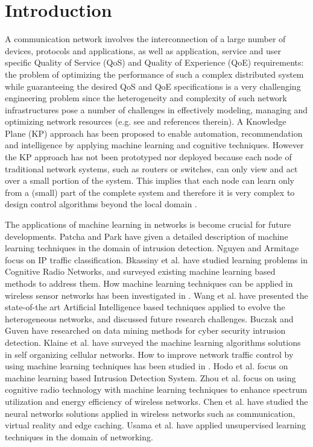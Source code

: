 \chapter*{\centering Introduction}  

A communication network involves the interconnection of a large number of devices, protocols and applications, as well as application, service and user specific Quality of Service (QoS) and Quality of Experience (QoE) requirements: the problem of optimizing the performance of such a complex distributed system while guaranteeing the desired QoS and QoE specifications is a very challenging engineering problem since the heterogeneity and complexity of such network infrastructures pose a number of challenges in effectively modeling, managing and optimizing network resources (e.g. see \cite{Neely2010,Lemeshko2019} and references therein). A Knowledge Plane (KP) approach \cite{Clark2003} has been proposed to enable automation, recommendation and intelligence by applying machine learning and cognitive techniques. However the KP approach has not been prototyped nor deployed because each node of traditional network systems, such as routers or switches, can only view and act over a small portion of the system. This implies that each node can learn only from a (small) part of the complete system and therefore it is very complex to design control algorithms beyond the local domain \cite{Mestres2017}.

The applications of machine learning in networks is become crucial for future developments. Patcha and Park \cite{Patcha2007} have given a detailed description of machine learning techniques in the domain of intrusion detection. Nguyen and Armitage \cite{Nguyen2008} focus on IP traffic classification. Bkassiny et al. \cite{Bkassiny2013} have studied learning problems in Cognitive Radio Networks, and surveyed existing machine learning based methods to address them. How machine learning techniques can be applied in wireless sensor networks has been investigated in \cite{Alsheikh2014}. Wang et al. \cite{Wang2015} have presented the state-of-the art Artificial Intelligence based techniques applied to evolve the heterogeneous networks, and discussed future research challenges. Buczak and Guven \cite{Buczak2016} have researched on data mining methods for cyber security intrusion detection. Klaine et al. \cite{Klaine2017} have surveyed the machine learning algorithms solutions in self organizing cellular networks. How to improve network traffic control by using machine learning techniques has been studied in \cite{Fadlullah2017}. Hodo et al. \cite{Hodo2017} focus on machine learning based Intrusion Detection System. Zhou et al. \cite{Zhou2017} focus on using cognitive radio technology with machine learning techniques to enhance spectrum utilization and energy efficiency of wireless networks. Chen et al. \cite{Chen2017} have studied the neural networks solutions applied in wireless networks such as communication, virtual reality and edge caching. Usama et al. \cite{Usama2017} have applied unsupervised learning techniques in the domain of networking.

